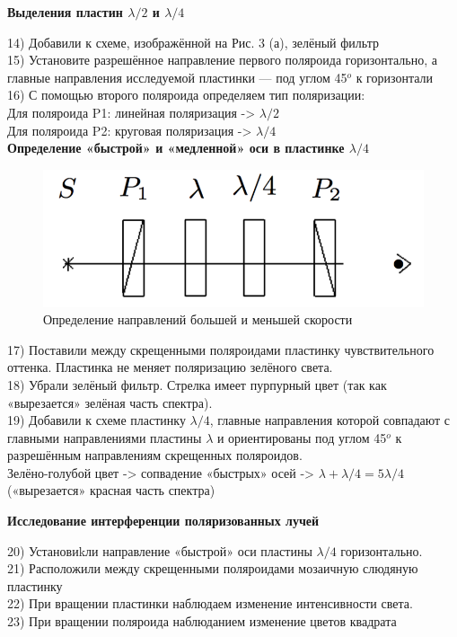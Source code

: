 \documentclass[a4paper,12pt]{article} %
\begin{document}
\textbf{Выделения пластин $\lambda/2$ и $\lambda/4$}

 14) Добавили к схеме, изображённой на Рис. 3 (а), зелёный фильтр\\
 15) Установите разрешённое направление первого поляроида горизонтально, а главные направления исследуемой пластинки — под углом 45$^o$ к горизонтали\\
 16) С помощью второго поляроида определяем тип поляризации: \\
	 Для поляроида P1: линейная поляризация -> $\lambda/2$ \\
		Для поляроида P2: круговая поляризация -> $\lambda/4$ \\ 
	

\textbf{Определение «быстрой» и «медленной» оси в пластинке $\lambda/4$}
\begin{figure}[H]
	\centering
	\includegraphics[width = 10 cm]{6.png}
	\caption{Определение направлений большей и меньшей скорости}
\end{figure}

 17) Поставили между скрещенными поляроидами пластинку чувствительного оттенка. Пластинка не меняет поляризацию зелёного света.\\
 18) Убрали зелёный фильтр. Стрелка имеет пурпурный цвет (так как «вырезается» зелёная часть спектра).\\
 19) Добавили к схеме пластинку $\lambda/4$, главные направления которой совпадают с главными направлениями пластины $\lambda$ и ориентированы под углом 45$^o$ к разрешённым направлениям скрещенных поляроидов.\\
 Зелёно-голубой цвет -> сопвадение «быстрых» осей -> $\lambda+\lambda/4 = 5\lambda/4$  \\(«вырезается» красная часть спектра)
	
	
\textbf{Исследование интерференции поляризованных лучей}

 20) Установиkли направление «быстрой» оси пластины $\lambda/4$ горизонтально.\\
 21) Расположили между скрещенными поляроидами мозаичную слюдяную пластинку\\
 22) При вращении пластинки наблюдаем изменение интенсивности света.\\
 23) При вращении поляроида наблюданием изменение цветов квадрата\\
\end{document}
